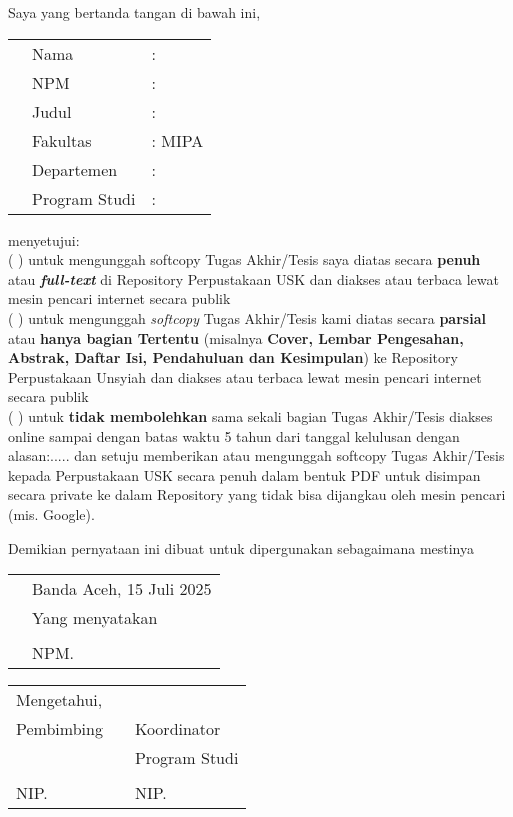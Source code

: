 \spernyataan %
\makeatletter
\noindent
Saya yang bertanda tangan di bawah ini,
\vspace{-0.1cm}
\begin{table}[H]
{\renewcommand{\arraystretch}{0.7}
\begin{tabular}{M{0.6cm}ll}
	& Nama   		&: \@fullname \\
	& NPM       	&: \@idnum \\
	& Judul 		&: \@judul \\
	& Fakultas		&: MIPA \\
	& Departemen 	&: \@dept \\
	& Program Studi &: \@prodi \\

\end{tabular}
}
\end{table}
\onehalfspacing
\vspace{-0.4cm}
\noindent
menyetujui: \\ 
( ) untuk mengunggah softcopy Tugas Akhir/Tesis saya diatas secara \textbf{penuh} atau \textit{\textbf{full-text}} di Repository Perpustakaan USK dan diakses atau terbaca lewat mesin pencari internet secara publik \\
( ) untuk mengunggah \textit{softcopy} Tugas Akhir/Tesis kami diatas secara \textbf{parsial} atau \textbf{hanya bagian Tertentu} (misalnya \textbf{Cover, Lembar Pengesahan, Abstrak, Daftar Isi, Pendahuluan dan Kesimpulan}) ke Repository Perpustakaan Unsyiah dan diakses atau terbaca lewat mesin pencari internet secara publik \\
( ) untuk \textbf{tidak membolehkan} sama sekali bagian Tugas Akhir/Tesis diakses online sampai dengan batas waktu 5 tahun dari tanggal kelulusan dengan alasan:.....
\vspace{0.4cm}
\noindent
dan setuju memberikan atau mengunggah softcopy Tugas Akhir/Tesis kepada Perpustakaan USK secara penuh dalam bentuk PDF untuk disimpan secara private ke dalam Repository yang tidak bisa dijangkau oleh mesin pencari (mis. Google).

\vspace{0.4cm}
\noindent
Demikian pernyataan ini dibuat untuk dipergunakan sebagaimana mestinya

\vspace{0.4cm}
{\renewcommand{\arraystretch}{0.8}
\begin{tabular}{p{7.5cm}l}
	&Banda Aceh, 15 Juli 2025 \\
	[-0.1cm]
	&Yang menyatakan \\
	[1.5cm]
	&\underline{\@fullname}\\
	&NPM. \@idnum 
\end{tabular}

\centering
\begin{tabular}{lll}
	Mengetahui, && \\
	[-0.1cm]
	Pembimbing &&Koordinator\\
	&&Program Studi \\
	[1.5cm]
	\underline{\@firstsupervisor}&&\underline{\@kaprodi}\\
	NIP. \@firstnip&&NIP. \@kaprodinip
\end{tabular}
}



\makeatother